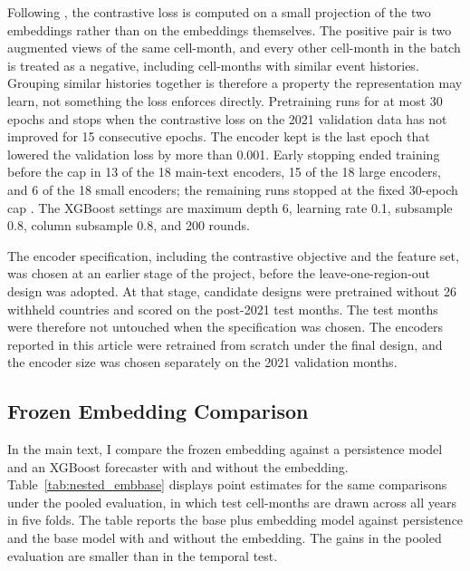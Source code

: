 \documentclass[11pt, letterpaper]{article}
\begin{document}
Following \citet{chen2020simclr}, the contrastive loss is computed on a small projection of the two embeddings rather than on the embeddings themselves. The positive pair is two augmented views of the same cell-month, and every other cell-month in the batch is treated as a negative, including cell-months with similar event histories. Grouping similar histories together is therefore a property the representation may learn, not something the loss enforces directly. Pretraining runs for at most 30 epochs and stops when the contrastive loss on the 2021 validation data has not improved for 15 consecutive epochs. The encoder kept is the last epoch that lowered the validation loss by more than 0.001. Early stopping ended training before the cap in 13 of the 18 main-text encoders, 15 of the 18 large encoders, and 6 of the 18 small encoders; the remaining runs stopped at the fixed 30-epoch cap \citep{prechelt1998early, goodfellow2016deep}. The XGBoost settings are maximum depth 6, learning rate 0.1, subsample 0.8, column subsample 0.8, and 200 rounds.

The encoder specification, including the contrastive objective and the feature set, was chosen at an earlier stage of the project, before the leave-one-region-out design was adopted. At that stage, candidate designs were pretrained without 26 withheld countries and scored on the post-2021 test months. The test months were therefore not untouched when the specification was chosen. The encoders reported in this article were retrained from scratch under the final design, and the encoder size was chosen separately on the 2021 validation months.

\subsection{Frozen Embedding Comparison}
In the main text, I compare the frozen embedding against a persistence model and an XGBoost forecaster with and without the embedding. Table~\ref{tab:nested_embbase} displays point estimates for the same comparisons under the pooled evaluation, in which test cell-months are drawn across all years in five folds. The table reports the base plus embedding model against persistence and the base model with and without the embedding. The gains in the pooled evaluation are smaller than in the temporal test.



\end{document}
